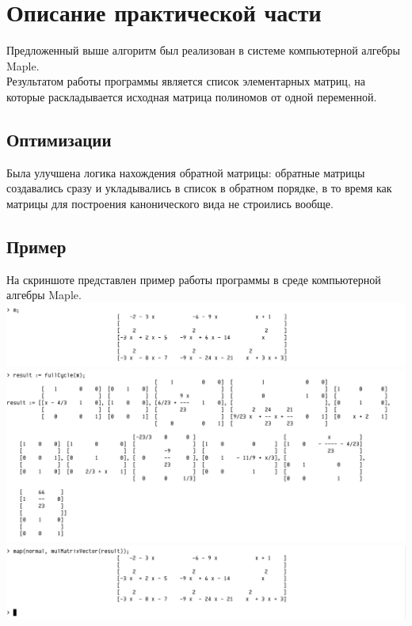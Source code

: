 \documentclass[14pt, a4paper]{extreport}
\begin{document}
\chapter{Описание практической части}
	Предложенный выше алгоритм был реализован в системе компьютерной алгебры Maple.\\
	Результатом работы программы является список элементарных матриц, на которые раскладывается исходная
	матрица полиномов от одной переменной.
	\section{Оптимизации}
	Была улучшена логика нахождения обратной матрицы: обратные матрицы
	создавались сразу и укладывались в список в обратном порядке, в то время как
	матрицы для построения канонического вида не строились вообще.
	\newpage
	\section{Пример}
	На скриншоте представлен пример работы программы в среде компьютерной алгебры Maple.\\
	\includegraphics[width=\textwidth]{result1.png}\\
	\includegraphics[width=\textwidth]{result2.png}\\
	\includegraphics[width=\textwidth]{result3.png}\\
\end{document}
